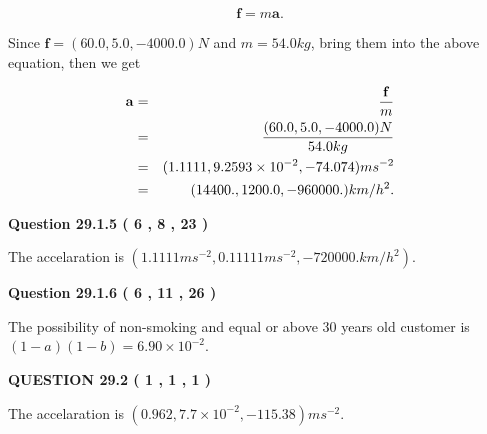 \documentclass[12pt]{article}
\begin{document}
\[
\mathbf{f}=m\mathbf{a}.
\]
 
Since $\mathbf{f}=( %
60.0,  %
5.0,  %
-4000.0 )N$
and $m= %
54.0 kg$, bring them into the above equation, then we get
 
\begin{eqnarray*}
\mathbf{a}&=&\frac{\mathbf{f}}m  \\
&=&\frac{(
60.0 ,
5.0 ,
-4000.0 )N
}{ %
54.0 kg}  \\
&=&(
1.1111 ,
9.2593 \times 10^{-2},
-74.074
)ms^{-2} \\
&=&(
14400. ,
1200.0 ,
-960000.
)km/h^2.
\end{eqnarray*}
 
 
 
  
\vspace{0.2in}
  
{\textbf{\Large{Question
29.1.5 
 (           6 ,           8 ,          23 )
}}}
  
  
 
 
\noindent{}
 
 
The accelaration is
$(
1.1111ms^{-2},
0.11111ms^{-2},
-720000.km/h^2
).
$
 
 
 
 
  
\vspace{0.2in}
  
{\textbf{\Large{Question
29.1.6 
 (           6 ,          11 ,          26 )
}}}
  
  
 
 
\noindent{}

The possibility of  %
 non-smoking and  %
equal or above 30 years old
customer is $ (1-a)(1-b) =  %
6.90 \times 10^{-2} $.
 
 
  
\vspace{0.2in}
  
{\textbf{\Large{QUESTION
29.2 
 (           1 ,           1 ,           1 )
}}}
  
  


 
 
\noindent{}
 
 
The accelaration is $  %
(
0.962,
7.7 \times 10^{-2},
-115.38)
ms^{-2} $.
 
\end{document}
